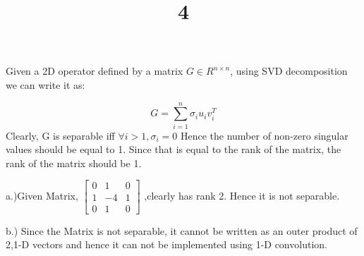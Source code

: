 \documentclass[a4paper]{article}
\title{4}
\date{}
\begin{document}
\maketitle


Given a 2D operator defined by a matrix $G \in R^{n\times n}$, using SVD decomposition we can write it as:

\begin{equation}
    G = \sum_{i = 1}^{n} \sigma_{i}u_{i}v_{i}^T
\end{equation}
Clearly, G is separable iff $\forall i > 1, \sigma_i = 0$
Hence the number of non-zero singular values should be equal to 1. Since that is equal to the rank of the matrix, the rank of the matrix should be 1.

a.)Given Matrix,
$
\begin{bmatrix}

    0 & 1 & 0 \\
    1 & -4 & 1\\
    0 & 1 & 0 
    
\end{bmatrix}
$
,clearly has rank 2. Hence it is not separable.

b.) Since the Matrix is not separable, it cannot be written as an outer product of 2,1-D vectors and hence it can not be implemented using 1-D convolution.
\end{document}
